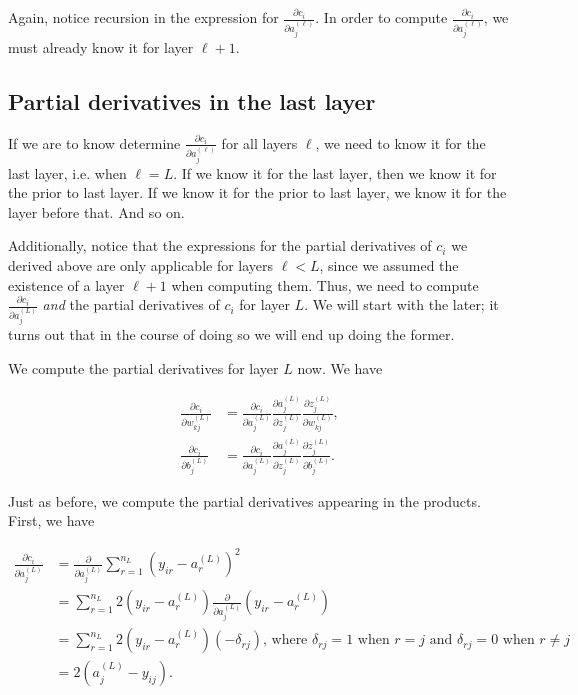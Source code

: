 \documentclass{article}
\begin{document}
	Again, notice recursion in the expression for $\frac{\partial c_i}{\partial a^{(\ell)}_j}$. In order to compute $\frac{\partial c_i}{\partial a^{(\ell)}_j}$, we must already know it for layer $\ell + 1$.
	
	\subsection*{Partial derivatives in the last layer}
	
	If we are to know determine $\frac{\partial c_i}{\partial a^{(\ell)}_j}$ for all layers $\ell$, we need to know it for the last layer, i.e. when $\ell = L$. If we know it for the last layer, then we know it for the prior to last layer. If we know it for the prior to last layer, we know it for the layer before that. And so on.
	
	Additionally, notice that the expressions for the partial derivatives of $c_i$ we derived above are only applicable for layers $\ell < L$, since we assumed the existence of a layer $\ell + 1$ when computing them. Thus, we need to compute $\frac{\partial c_i}{\partial a^{(L)}_j}$ \textit{and} the partial derivatives of $c_i$ for layer $L$. We will start with the later; it turns out that in the course of doing so we will end up doing the former.
	
	We compute the partial derivatives for layer $L$ now. We have
	
	\begin{align*}
		\frac{\partial c_i}{\partial w^{(L)}_{kj}} &= \frac{\partial c_i}{\partial a^{(L)}_j} \frac{\partial a^{(L)}_j}{\partial z^{(L)}_j} \frac{\partial z^{(L)}_j}{\partial w^{(L)}_{kj}}, \\
		\frac{\partial c_i}{\partial b^{(L)}_j} &= \frac{\partial c_i}{\partial a^{(L)}_j} \frac{\partial a^{(L)}_j}{\partial z^{(L)}_j} \frac{\partial z^{(L)}_j}{\partial b^{(L)}_j}.
	\end{align*}
	
	Just as before, we compute the partial derivatives appearing in the products. First, we have
	
	\begin{align*}
		\frac{\partial c_i}{\partial a^{(L)}_j} &= \frac{\partial}{\partial a^{(L)}_j} \sum_{r = 1}^{n_L} (y_{ir} - a^{(L)}_r)^2 \\
		&= \sum_{r = 1}^{n_L} 2(y_{ir} - a^{(L)}_r)\frac{\partial}{\partial a^{(L)}_j}\left(y_{ir} - a^{(L)}_r\right) \\
		&= \sum_{r = 1}^{n_L} 2(y_{ir} - a^{(L)}_r)(-\delta_{rj})\text{, where $\delta_{rj} = 1$ when $r = j$ and $\delta_{rj} = 0$ when $r \neq j$} \\
		&= 2(a^{(L)}_j - y_{ij}).
	\end{align*}
	
\end{document}
